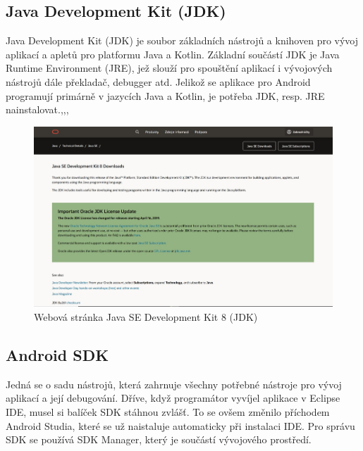 \documentclass{vskpou} %
\begin{document}
\subsection{Java Development Kit (JDK)}
Java Development Kit (JDK) je soubor základních nástrojů a knihoven pro vývoj aplikací a apletů pro platformu Java a Kotlin. Základní součástí JDK je Java Runtime Environment (JRE), jež slouží pro spouštění aplikací i vývojových nástrojů dále překladač, debugger atd. Jelikož se aplikace pro Android programují primárně v jazycích Java a Kotlin, je potřeba JDK, resp. JRE nainstalovat.\cite{1},\cite{11},\cite{17},\cite{18}  

 \begin{figure}[h!]
\centering
\includegraphics[scale=0.5]{images/7.jpg}
\caption{Webová stránka Java SE Development Kit 8 (JDK)}
\label{7}
\end{figure}
\newpage
\subsection{Android SDK}
Jedná se o sadu nástrojů, která zahrnuje všechny potřebné nástroje pro vývoj aplikací a její debugování. Dříve, když programátor vyvíjel aplikace v Eclipse IDE, musel si balíček SDK stáhnou zvlášť. To se ovšem změnilo příchodem Android Studia, které se už naistaluje automaticky při instalaci IDE.  Pro správu SDK se používá SDK Manager, který je součástí vývojového prostředí.
\end{document}
